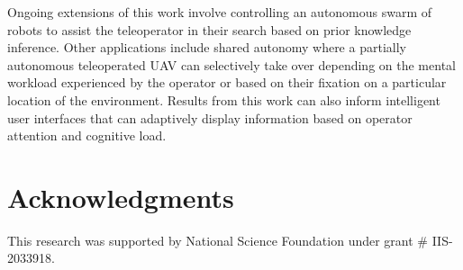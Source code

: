 \documentclass{article}
\begin{document}



Ongoing extensions of this work involve controlling an autonomous swarm of robots to assist the teleoperator in their search based on prior knowledge inference. Other applications include shared autonomy where a partially autonomous teleoperated UAV can selectively take over depending on the mental workload experienced by the operator or based on their fixation on a particular location of the environment. Results from this work can also inform intelligent user interfaces that can adaptively display information based on operator attention and cognitive load.
	
	\section{Acknowledgments}
	This research was supported by National Science Foundation under grant \# IIS-2033918.




\end{document}
